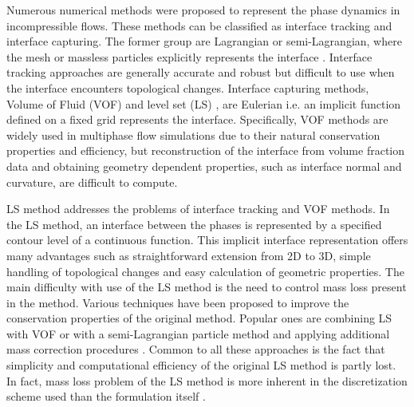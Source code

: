\documentclass[11pt,a4paper,twoside]{article}
\begin{document}
	Numerous numerical methods were proposed to represent the phase dynamics in incompressible flows. These methods can be classified as interface tracking and interface capturing. The former group are Lagrangian or semi-Lagrangian, where the mesh or massless particles explicitly represents the interface \cite{unverdi_front-tracking_1992,harlow_numerical_1965}. Interface tracking approaches are generally accurate and robust but difficult to use when the interface encounters topological changes. Interface capturing methods, Volume of Fluid (VOF) \cite{hirt_volume_1981} and level set (LS) \cite{osher_fronts_1988},  are Eulerian  i.e. an implicit function defined on a fixed grid represents the interface. Specifically, VOF methods are widely used in multiphase flow simulations due to their natural  conservation properties and efficiency, but reconstruction of the interface from volume fraction data and obtaining geometry dependent properties, such as interface  normal and curvature, are difficult to compute. 
		
	LS method addresses the  problems of interface tracking and VOF methods. In the LS method, an interface between the phases is represented by a specified contour level of a continuous function. This implicit interface representation offers many advantages such as straightforward extension from 2D to 3D, simple handling of topological changes and easy calculation of geometric properties. The main difficulty with use of the LS method is the need to control mass loss present in the method. Various techniques have been proposed to improve the conservation properties of the original method. Popular ones are combining LS with VOF \cite{sussman_coupled_2000} or with a semi-Lagrangian particle method \cite{enright_hybrid_2002} and applying additional mass correction procedures \cite{sussman_efficient_1999,wang_hybrid_2012}. Common to all these approaches is the fact that simplicity and computational efficiency of the original LS method is partly lost.  In fact, mass loss problem of the LS method is more inherent in the discretization scheme used than the formulation itself \cite{marchandise_quadrature-free_2006,karakus_gpu-accelerated_2016}.
		
\end{document}
